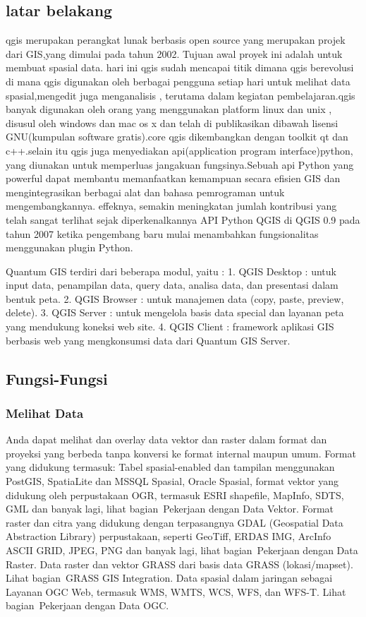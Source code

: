  \subsection{latar belakang}
 qgis merupakan perangkat lunak berbasis open source yang merupakan projek dari GIS,yang dimulai pada tahun 2002. Tujuan awal proyek ini adalah untuk membuat spasial data. hari ini qgis sudah mencapai titik dimana qgis berevolusi di mana qgis digunakan oleh berbagai pengguna setiap hari untuk melihat data spasial,mengedit juga menganalisis , terutama dalam kegiatan pembelajaran.qgis banyak digunakan oleh orang yang menggunakan platform linux dan unix , disusul oleh windows dan mac os x dan telah di publikasikan dibawah lisensi GNU(kumpulan software gratis).core qgis dikembangkan dengan toolkit qt dan c++.selain itu qgis juga menyediakan api(application program interface)python, yang diunakan untuk memperluas jangakuan fungsinya.Sebuah api Python yang powerful dapat membantu memanfaatkan kemampuan secara efisien GIS dan mengintegrasikan berbagai alat dan bahasa pemrograman untuk mengembangkannya. effeknya, semakin meningkatan jumlah kontribusi yang telah sangat terlihat sejak diperkenalkannya API Python QGIS di QGIS 0.9 pada tahun 2007 ketika pengembang baru mulai menambahkan fungsionalitas menggunakan plugin Python.

Quantum GIS terdiri dari beberapa modul, yaitu :
1.	QGIS Desktop : untuk input data, penampilan data, query data, analisa data, dan presentasi dalam bentuk peta.
2.	QGIS Browser : untuk manajemen data (copy, paste, preview, delete).
3.	QGIS Server : untuk mengelola basis data special dan layanan peta yang mendukung koneksi web site.
4.	QGIS Client : framework aplikasi GIS berbasis web yang mengkonsumsi data dari Quantum GIS Server.

\subsection{Fungsi-Fungsi}
\subsubsection {Melihat Data}
Anda dapat melihat dan overlay data vektor dan raster dalam format dan proyeksi yang berbeda tanpa konversi ke format internal maupun umum. Format yang didukung termasuk:
Tabel spasial-enabled dan tampilan menggunakan PostGIS, SpatiaLite dan MSSQL Spasial, Oracle Spasial, format vektor yang didukung oleh perpustakaan OGR, termasuk ESRI shapefile, MapInfo, SDTS, GML dan banyak lagi, lihat bagian Pekerjaan dengan Data Vektor.
Format raster dan citra yang didukung dengan terpasangnya GDAL (Geospatial Data Abstraction Library) perpustakaan, seperti GeoTiff, ERDAS IMG, ArcInfo ASCII GRID, JPEG, PNG dan banyak lagi, lihat bagian Pekerjaan dengan Data Raster.
Data raster dan vektor GRASS dari basis data GRASS (lokasi/mapset). Lihat bagian GRASS GIS Integration.
Data spasial dalam jaringan sebagai Layanan OGC Web, termasuk WMS, WMTS, WCS, WFS, dan WFS-T. Lihat bagian Pekerjaan dengan Data OGC.
